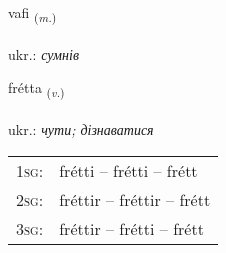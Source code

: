 \documentclass[frontgrid, backgrid]{flacards}\usepackage[]{graphicx}\usepackage[]{xcolor}
\begin{document}
{vafi \small{\textsubscript{(\textit{m.})}} \\[1ex] %
\textphonetic{[vaːvɪ]} \\
ukr.: \emph{сумнів} \\  [2ex]
\renewcommand*{\arraystretch}{0.8}
}

\renewcommand{\flhead}{\vskip5pt \fboxsep=0pt {\small\bfseries\footnotesize Sagnorð | дієслово}}
\renewcommand{\fcfoot}{\vskip5pt \fboxsep=0pt \hspace{2pt}{\small\bfseries\footnotesize 2K}}

\renewcommand{\blhead}{\vskip5pt {\small\bfseries\footnotesize Sagnorð | дієслово }}
\renewcommand{\bcfoot}{\vskip5pt \hspace{2pt}{\small\bfseries\footnotesize 2K}}


{frétta \small{\textsubscript{(\textit{v.})}} \\[1ex] %
\textphonetic{[frjɛhta]} \\
ukr.: \emph{чути; дізнаватися} \\  [2ex]
\renewcommand*{\arraystretch}{0.8}
\begin{tabular}{p{1cm}l}
\textsc{1sg}: & frétti -- frétti -- frétt \\ 
\textsc{2sg}: & fréttir -- fréttir -- frétt \\ 
\textsc{3sg}: & fréttir -- frétti -- frétt \\ 
\end{tabular}
}

\renewcommand{\flhead}{\vskip5pt \fboxsep=0pt {\small\bfseries\footnotesize Nafnorð | іменник}}
\renewcommand{\fcfoot}{\vskip5pt \fboxsep=0pt \hspace{2pt}{\small\bfseries\footnotesize 2K}}
\end{document}
